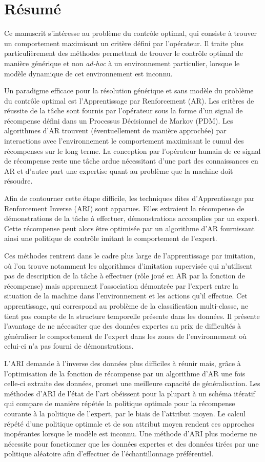 \documentclass[9pt]{article}
\begin{document}
\section*{Résumé}
Ce manuscrit s'intéresse au problème du contrôle optimal, qui consiste à trouver un comportement maximisant un critère défini par l'opérateur. Il traite plus particulièrement des méthodes permettant de trouver le contrôle optimal de manière générique et non \emph{ad-hoc} à un environnement particulier, lorsque le modèle dynamique de cet environnement est inconnu.

Un paradigme efficace pour la résolution générique et sans modèle du problème du contrôle optimal est l'Apprentissage par Renforcement (AR). Les critères de réussite de la tâche sont fournis par l'opérateur sous la forme d'un signal de récompense défini dans un Processus Décisionnel de Markov (PDM). Les algorithmes d'AR trouvent (éventuellement de manière approchée) par interactions avec l'environnement le comportement maximisant le cumul des récompenses sur le long terme. La conception par l'opérateur humain de ce signal de récompense reste une tâche ardue nécessitant d'une part des connaissances en AR et d'autre part une expertise quant au problème que la machine doit résoudre.

Afin de contourner cette étape difficile, les techniques dites d'Apprentissage par Renforcement Inverse (ARI) sont apparues. Elles extraient la récompense de démonstrations de la tâche à effectuer, démonstrations accomplies par un expert. Cette récompense peut alors être optimisée par un algorithme d'AR fournissant ainsi une politique de contrôle imitant le comportement de l'expert.

Ces méthodes rentrent dans le cadre plus large de l'apprentissage par imitation, où l'on trouve notamment les algorithmes d'imitation supervisée qui n'utilisent pas de description de la tâche à effectuer (rôle joué en AR par la fonction de récompense) mais apprennent l'association démontrée par l'expert entre la situation de la machine dans l'environnement et les actions qu'il effectue. Cet apprentissage, qui correspond au problème de la classification multi-classe, ne tient pas compte de la structure temporelle présente dans les données. Il présente l'avantage de ne nécessiter que des données expertes au prix de difficultés à généraliser le comportement de l'expert dans les zones de l'environnement où celui-ci n'a pas fourni de démonstrations.

L'ARI demande à l'inverse des données plus difficiles à réunir mais, grâce à l'optimisation de la fonction de récompense par un algorithme d'AR une fois celle-ci extraite des données, promet une meilleure capacité de généralisation. Les méthodes d'ARI de l'état de l'art obéissent pour la plupart à un schéma itératif qui compare de manière répétée la politique optimale pour la récompense courante à la politique de l'expert, par le biais de l'attribut moyen. Le calcul répété d'une politique optimale et de son attribut moyen rendent ces approches inopérantes lorsque le modèle est inconnu. Une méthode d'ARI plus moderne ne nécessite pour fonctionner que les données expertes et des données tirées par une politique aléatoire afin d'effectuer de l'échantillonnage préférentiel.
\end{document}
